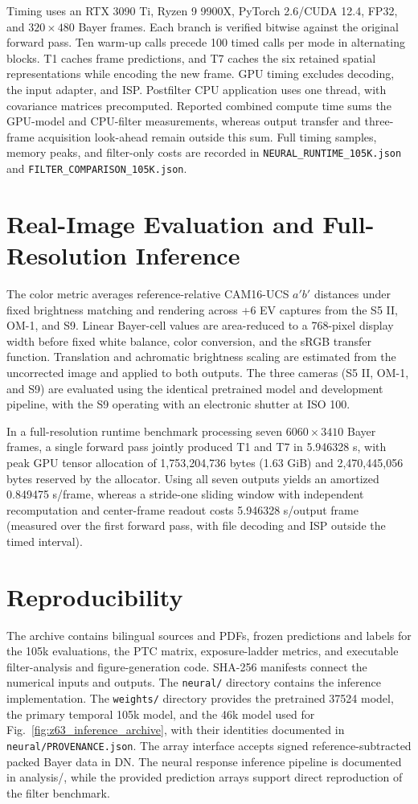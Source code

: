 Timing uses an RTX 3090 Ti, Ryzen 9 9900X, PyTorch 2.6/CUDA 12.4, FP32, and $320\times480$ Bayer frames. Each branch is verified bitwise against the original forward pass. Ten warm-up calls precede 100 timed calls per mode in alternating blocks. T1 caches frame predictions, and T7 caches the six retained spatial representations while encoding the new frame. GPU timing excludes decoding, the input adapter, and ISP. Postfilter CPU application uses one thread, with covariance matrices precomputed. Reported combined compute time sums the GPU-model and CPU-filter measurements, whereas output transfer and three-frame acquisition look-ahead remain outside this sum. Full timing samples, memory peaks, and filter-only costs are recorded in \texttt{NEURAL\_RUNTIME\_105K.json} and \texttt{FILTER\_COMPARISON\_105K.json}.

\section{Real-Image Evaluation and Full-Resolution Inference}
The color metric averages reference-relative CAM16-UCS $a'b'$ distances under fixed brightness matching and rendering across +6 EV captures from the S5 II, OM-1, and S9. Linear Bayer-cell values are area-reduced to a 768-pixel display width before fixed white balance, color conversion, and the sRGB transfer function. Translation and achromatic brightness scaling are estimated from the uncorrected image and applied to both outputs. The three cameras (S5 II, OM-1, and S9) are evaluated using the identical pretrained model and development pipeline, with the S9 operating with an electronic shutter at ISO 100.

In a full-resolution runtime benchmark processing seven $6060\times3410$ Bayer frames, a single forward pass jointly produced T1 and T7 in 5.946328 s, with peak GPU tensor allocation of 1,753,204,736 bytes (1.63 GiB) and 2,470,445,056 bytes reserved by the allocator. Using all seven outputs yields an amortized 0.849475 s/frame, whereas a stride-one sliding window with independent recomputation and center-frame readout costs 5.946328 s/output frame (measured over the first forward pass, with file decoding and ISP outside the timed interval).

\section{Reproducibility}
The archive contains bilingual sources and PDFs, frozen predictions and labels for the 105k evaluations, the PTC matrix, exposure-ladder metrics, and executable filter-analysis and figure-generation code. SHA-256 manifests connect the numerical inputs and outputs. The \texttt{neural/} directory contains the inference implementation. The \texttt{weights/} directory provides the pretrained 37524 model, the primary temporal 105k model, and the 46k model used for Fig.~\ref{fig:z63_inference_archive}, with their identities documented in \texttt{neural/PROVENANCE.json}. The array interface accepts signed reference-subtracted packed Bayer data in DN. The neural response inference pipeline is documented in analysis/, while the provided prediction arrays support direct reproduction of the filter benchmark.
